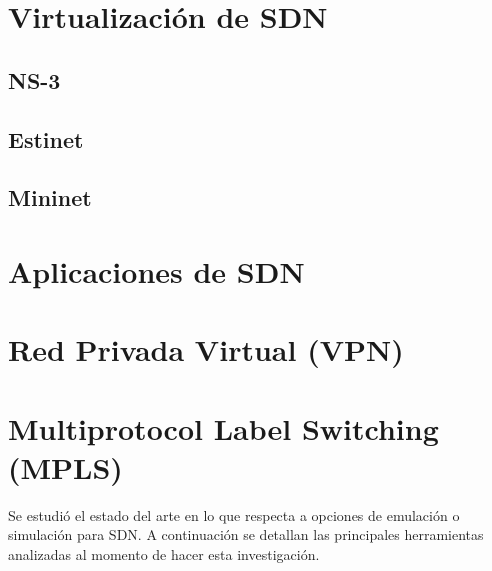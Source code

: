 





\section{Virtualización de SDN}
\subsection{NS-3}
\subsection{Estinet}
\subsection{Mininet}



\section{Aplicaciones de SDN}

\section{Red Privada Virtual (VPN)}

\section{Multiprotocol Label Switching (MPLS)}

Se estudió el estado del arte en lo que respecta a opciones de emulación o simulación para SDN. A continuación se detallan las principales herramientas analizadas al momento de hacer esta investigación.\\

